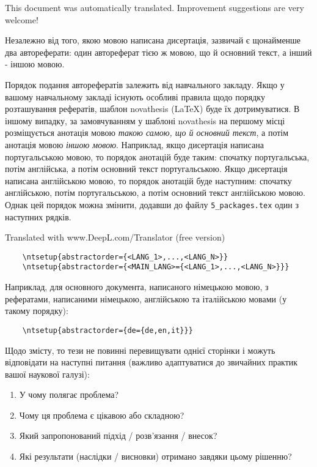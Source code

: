 
\begin{otherlanguage}{english}
  This document was automatically translated.  Improvement suggestions are very welcome!
\end{otherlanguage}

Незалежно від того, якою мовою написана дисертація, зазвичай є щонайменше два автореферати: один автореферат тією ж мовою, що й основний текст, а інший - іншою мовою.

Порядок подання авторефератів залежить від навчального закладу.  Якщо у вашому навчальному закладі існують особливі правила щодо порядку розташування рефератів, шаблон \gls{novathesis} (\LaTeX) буде їх дотримуватися.  В іншому випадку, за замовчуванням у шаблоні \gls{novathesis} на першому місці розміщується анотація мовою \emph{такою самою, що й основний текст}, а потім анотація мовою \emph{іншою мовою}. Наприклад, якщо дисертація написана португальською мовою, то порядок анотацій буде таким: спочатку португальська, потім англійська, а потім основний текст португальською. Якщо дисертація написана англійською мовою, то порядок анотацій буде наступним: спочатку англійською, потім португальською, а потім основний текст англійською мовою.
%
Однак цей порядок можна змінити, додавши до файлу \verb+5_packages.tex+ один з наступних рядків.

Translated with www.DeepL.com/Translator (free version)

\begin{verbatim}
    \ntsetup{abstractorder={<LANG_1>,...,<LANG_N>}}
    \ntsetup{abstractorder={<MAIN_LANG>={<LANG_1>,...,<LANG_N>}}}
\end{verbatim}

Наприклад, для основного документа, написаного німецькою мовою, з рефератами, написаними німецькою, англійською та італійською мовами (у такому порядку):

\begin{verbatim}
    \ntsetup{abstractorder={de={de,en,it}}}
\end{verbatim}

Щодо змісту, то тези не повинні перевищувати однієї сторінки і можуть відповідати на наступні питання (важливо адаптуватися до звичайних практик вашої наукової галузі):

\begin{enumerate}
  \item У чому полягає проблема?
  \item Чому ця проблема є цікавою або складною?
  \item Який запропонований підхід / розв’язання / внесок?
  \item Які результати (наслідки / висновки) отримано завдяки цьому рішенню?
\end{enumerate}

